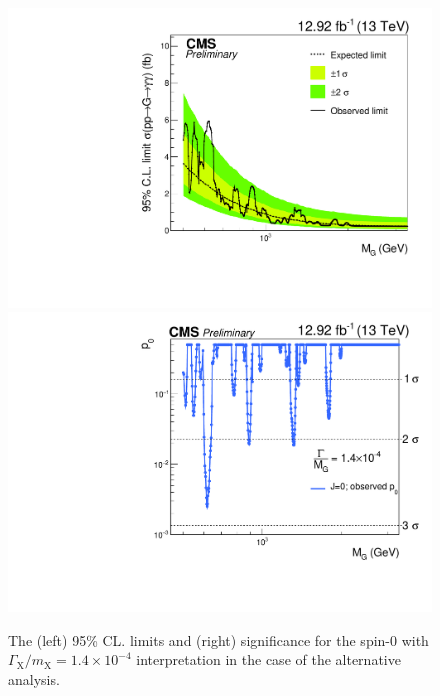 \begin{figure}[htb]
    \centering
    \includegraphics[width=\cmsFigWidth]{HighMassDiphoton/HMD_12p9ifb_V2_LIMIT.pdf}
    \includegraphics[width=\cmsFigWidth]{HighMassDiphoton/NarrowResLimit_pval_BIAS_SIGNIFICANCE.pdf} 
    \caption{The (left) 95\% CL. limits and (right) significance for
      the  spin-0 with  $\Gamma_{\mathrm{X}}/m_{\mathrm{X}} =
1.4\times10^{-4}$ interpretation in the case of the alternative analysis.
      \label{fig:limits}
    }
\end{figure}


